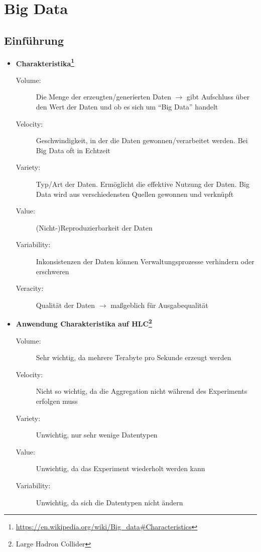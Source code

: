 \section{Big Data}

\subsection{Einführung}
\begin{itemize}
	\item \textbf{Charakteristika\footnote{\url{https://en.wikipedia.org/wiki/Big_data\#Characteristics}}}
	\begin{description}
		\item[Volume:] Die Menge der erzeugten/generierten Daten \(\rightarrow\) gibt Aufschluss über den Wert der Daten und ob es sich um "`Big Data"' handelt
		\item[Velocity:] Geschwindigkeit, in der die Daten gewonnen/verarbeitet werden. Bei Big Data oft in Echtzeit
		\item[Variety:] Typ/Art der Daten. Ermöglicht die effektive Nutzung der Daten. Big Data wird aus verschiedensten Quellen gewonnen und verknüpft
		\item[Value:] (Nicht-)Reproduzierbarkeit der Daten
		\item[Variability:] Inkonsistenzen der Daten können Verwaltungsprozesse verhindern oder erschweren
		\item[Veracity:] Qualität der Daten \(\rightarrow\) maßgeblich für Ausgabequalität
	\end{description}
	\item \textbf{Anwendung Charakteristika auf HLC\footnote{Large Hadron Collider}}
	\begin{description}
		\item[Volume:] Sehr wichtig, da mehrere Terabyte pro Sekunde erzeugt werden
		\item[Velocity:] Nicht so wichtig, da die Aggregation nicht während des Experiments erfolgen muss
		\item[Variety:] Unwichtig, nur sehr wenige Datentypen
		\item[Value:] Unwichtig, da das Experiment wiederholt werden kann
		\item[Variability:] Unwichtig, da sich die Datentypen nicht ändern 
	\end{description}
\end{itemize}


